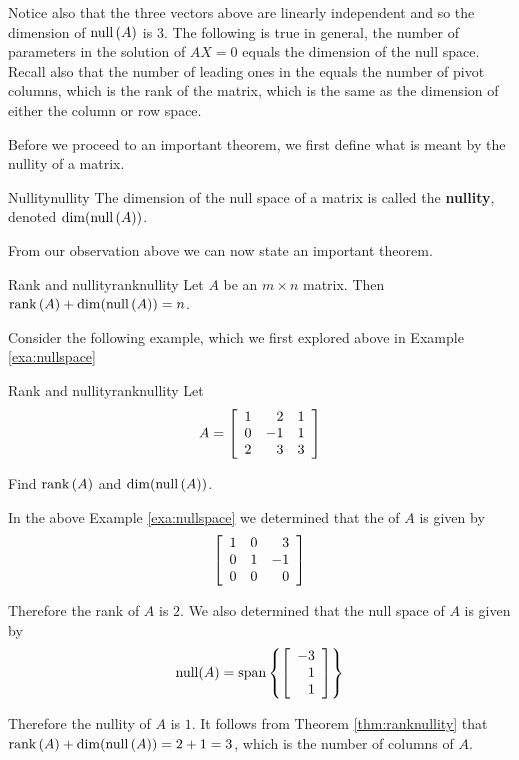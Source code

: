 Notice also that the three vectors above are linearly independent and
so the dimension of $\mbox{null} \left( A\right) $ is 3. The following is
true in general, the number of parameters in the solution of $AX=0$
equals the dimension of the null space. Recall also that the number of
leading ones in the {\rref} equals the number of pivot columns, which is
the rank of the matrix, which is the same as the dimension of either
the column or row space.

Before we proceed to an important theorem, we first define what is meant by the nullity of a matrix. 

\begin{definition}{Nullity}{nullity}
The dimension of the null space of a matrix is called the \textbf{nullity}, denoted $\dim( \mbox{null}\left(A\right))$.
\end{definition}

From our observation above we can now state an important theorem.

\begin{theorem}{Rank and nullity}{ranknullity}
Let $A$ be an $m\times n$ matrix. Then $\mbox{rank}\left( A\right) + \dim( \mbox{null}\left(A\right)) =n$. 
\end{theorem}

Consider the following example, which we first explored above in Example \ref{exa:nullspace}

\begin{example}{Rank and nullity}{ranknullity}
Let
\begin{equation*}
A=\left[
\begin{array}{rrr}
1 & 2 & 1 \\
0 & -1 & 1 \\
2 & 3 & 3
\end{array}
\right] 
\end{equation*}

Find $\mbox{rank}\left( A\right)$ and $\dim( \mbox{null}\left(A\right))$. 
\end{example}

\medskip
\begin{solution}
In the above Example \ref{exa:nullspace} we determined that the {\rref} of $A$ is given by 
\[
\left[ 
\begin{array}{rrr}
1 & 0 & 3 \\ 
0 & 1 & -1  \\
0 & 0 & 0 
\end{array}
\right]
\]

Therefore the rank of $A$ is $2$. We also determined that the null space of $A$ is given by 
\[
\mbox{null} (A) = \mbox{span} \left\{ \left[ 
\begin{array}{r}
-3 \\ 
1 \\ 
1
\end{array}
\right]
\right\}
\]

Therefore the nullity of $A$ is $1$. It follows from Theorem \ref{thm:ranknullity} that $\mbox{rank}\left( A\right) + \dim( \mbox{null}\left(A\right)) = 2 + 1 = 3$, which is the number of columns of $A$.
\end{solution} 


